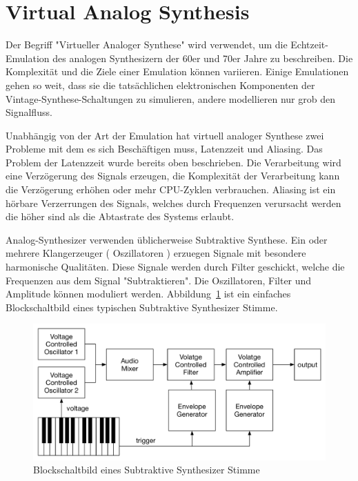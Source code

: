\section{Virtual Analog Synthesis}

Der Begriff "Virtueller Analoger Synthese" wird verwendet, um die Echtzeit-Emulation des analogen Synthesizern der 60er und 70er Jahre zu beschreiben. Die Komplexität und die Ziele einer Emulation können variieren. Einige Emulationen gehen so weit, dass sie die tatsächlichen elektronischen Komponenten der Vintage-Synthese-Schaltungen zu simulieren, andere modellieren nur grob den Signalfluss.

Unabhängig von der Art der Emulation hat virtuell analoger Synthese zwei Probleme mit dem es sich Beschäftigen muss, Latenzzeit und Aliasing. Das Problem der Latenzzeit wurde bereits oben beschrieben. Die Verarbeitung wird eine Verzögerung des Signals erzeugen, die Komplexität der Verarbeitung kann die Verzögerung erhöhen oder mehr CPU-Zyklen verbrauchen. Aliasing ist ein hörbare Verzerrungen des Signals, welches durch Frequenzen verursacht werden die höher sind als die Abtastrate des Systems erlaubt.

Analog-Synthesizer verwenden üblicherweise Subtraktive Synthese. Ein oder mehrere Klangerzeuger ( Oszillatoren ) erzuegen Signale mit besondere harmonische Qualitäten. Diese Signale werden durch Filter geschickt, welche die Frequenzen aus dem Signal "Subtraktieren". Die Oszillatoren, Filter und Amplitude können moduliert werden. Abbildung~\ref{fig:synth_voice_block} ist ein einfaches Blockschaltbild eines typischen Subtraktive Synthesizer Stimme.

\begin{figure}[H]
    \centering
    \includegraphics[width=\textwidth]{assets/synth_voice_block.pdf}
    \caption{Blockschaltbild eines Subtraktive Synthesizer Stimme}
    \label{fig:synth_voice_block}
\end{figure}